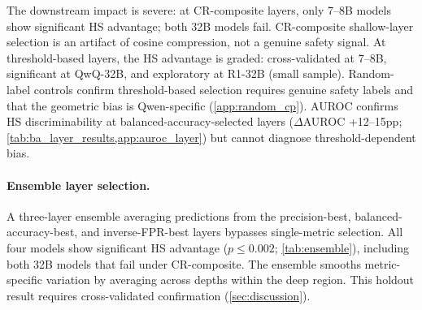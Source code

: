 \begin{table}[t]
\centering
\small
{}
\caption{Layer selection sensitivity. $^a$\,Crossing-rate composite. $^b$\,Threshold-based consensus. $^c$\,HS$-$text precision difference (pp) at threshold-based layer. $p$: HS vs.\ text at threshold-based layer. $\dagger$\,Sample-limited ($n \leq 20$).}
\label{tab:layer_selection}
\end{table}

The downstream impact is severe: at CR-composite layers, only 7--8B models show significant HS advantage; both 32B models fail. CR-composite shallow-layer selection is an artifact of cosine compression, not a genuine safety signal. At threshold-based layers, the HS advantage is graded: cross-validated at 7--8B, significant at QwQ-32B, and exploratory at R1-32B (small sample). Random-label controls confirm threshold-based selection requires genuine safety labels and that the geometric bias is Qwen-specific (\cref{app:random_cp}). AUROC confirms HS discriminability at balanced-accuracy-selected layers ($\Delta$AUROC +12--15pp; \cref{tab:ba_layer_results,app:auroc_layer}) but cannot diagnose threshold-dependent bias.

\paragraph{Ensemble layer selection.} A three-layer ensemble averaging predictions from the precision-best, balanced-accuracy-best, and inverse-FPR-best layers bypasses single-metric selection. All four models show significant HS advantage ($p \leq 0.002$; \cref{tab:ensemble}), including both 32B models that fail under CR-composite. The ensemble smooths metric-specific variation by averaging across depths within the deep region. This holdout result requires cross-validated confirmation (\cref{sec:discussion}).

